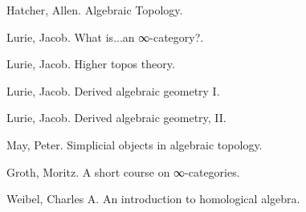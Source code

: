 \documentclass[a4paper]{amsart}
\numberwithin{figure}{section}
\theoremstyle{theorem}
\theoremstyle{definition}
\begin{document}



\begin{thebibliography}{99.}

Hatcher, Allen.
\newblock Algebraic Topology.

Lurie, Jacob.
\newblock What is...an ∞-category?.

Lurie, Jacob.
\newblock Higher topos theory.

Lurie, Jacob.
\newblock Derived algebraic geometry I.

Lurie, Jacob.
\newblock Derived algebraic geometry, II.

May, Peter.
\newblock Simplicial objects in algebraic topology.

Groth, Moritz.
\newblock A short course on ∞-categories.

Weibel, Charles  A.
\newblock An introduction to homological algebra.
\end{thebibliography}
\end{document}
